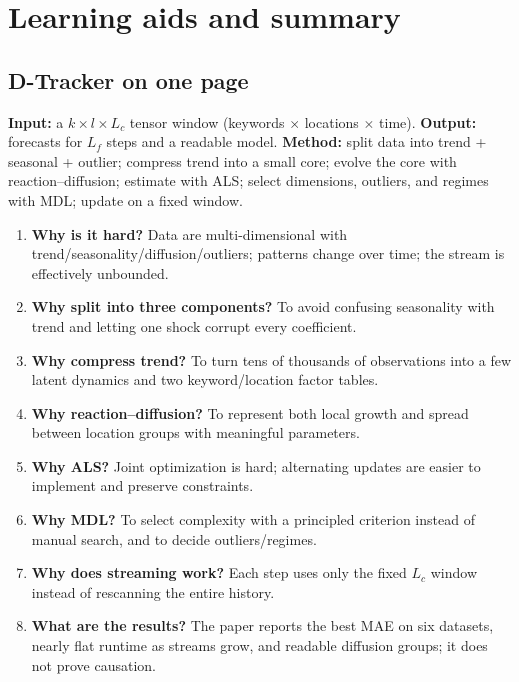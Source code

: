 \section{Learning aids and summary}
\label{app:learning}

\subsection*{D-Tracker on one page}

\begin{keypoint}
\textbf{Input:} a $k\times l\times L_c$ tensor window (keywords $\times$ locations $\times$ time).
\textbf{Output:} forecasts for $L_f$ steps and a readable model.
\textbf{Method:} split data into trend + seasonal + outlier; compress trend into a small core; evolve
the core with reaction--diffusion; estimate with ALS; select dimensions, outliers, and regimes with
MDL; update on a fixed window.
\end{keypoint}

\begin{enumerate}
  \item \textbf{Why is it hard?} Data are multi-dimensional with trend/seasonality/diffusion/outliers;
        patterns change over time; the stream is effectively unbounded.
  \item \textbf{Why split into three components?} To avoid confusing seasonality with trend and letting
        one shock corrupt every coefficient.
  \item \textbf{Why compress trend?} To turn tens of thousands of observations into a few latent
        dynamics and two keyword/location factor tables.
  \item \textbf{Why reaction--diffusion?} To represent both local growth and spread between location
        groups with meaningful parameters.
  \item \textbf{Why ALS?} Joint optimization is hard; alternating updates are easier to implement and
        preserve constraints.
  \item \textbf{Why MDL?} To select complexity with a principled criterion instead of manual search,
        and to decide outliers/regimes.
  \item \textbf{Why does streaming work?} Each step uses only the fixed $L_c$ window instead of
        rescanning the entire history.
  \item \textbf{What are the results?} The paper reports the best MAE on six datasets, nearly flat
        runtime as streams grow, and readable diffusion groups; it does not prove causation.
\end{enumerate}

